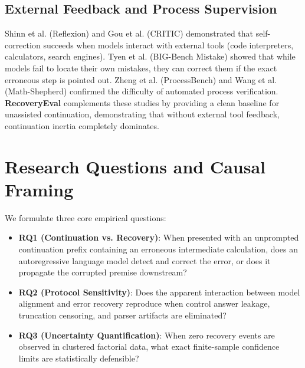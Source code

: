 \documentclass[10pt,conference]{IEEEtran}
\begin{document}
\subsection{External Feedback and Process Supervision}
Shinn et al. \cite{shinn2023reflexion} (Reflexion) and Gou et al. \cite{gou2024critic} (CRITIC) demonstrated that self-correction succeeds when models interact with external tools (code interpreters, calculators, search engines). Tyen et al. \cite{tyen2024bigbenchmistake} (BIG-Bench Mistake) showed that while models fail to locate their own mistakes, they can correct them if the exact erroneous step is pointed out. Zheng et al. \cite{zheng2024processbench} (ProcessBench) and Wang et al. \cite{wang2024mathshepherd} (Math-Shepherd) confirmed the difficulty of automated process verification. \textbf{RecoveryEval} complements these studies by providing a clean baseline for unassisted continuation, demonstrating that without external tool feedback, continuation inertia completely dominates.

\section{Research Questions and Causal Framing}
We formulate three core empirical questions:
\begin{itemize}
    \item \textbf{RQ1 (Continuation vs. Recovery)}: When presented with an unprompted continuation prefix containing an erroneous intermediate calculation, does an autoregressive language model detect and correct the error, or does it propagate the corrupted premise downstream?
    \item \textbf{RQ2 (Protocol Sensitivity)}: Does the apparent interaction between model alignment and error recovery reproduce when control answer leakage, truncation censoring, and parser artifacts are eliminated?
    \item \textbf{RQ3 (Uncertainty Quantification)}: When zero recovery events are observed in clustered factorial data, what exact finite-sample confidence limits are statistically defensible?
\end{itemize}
\end{document}
